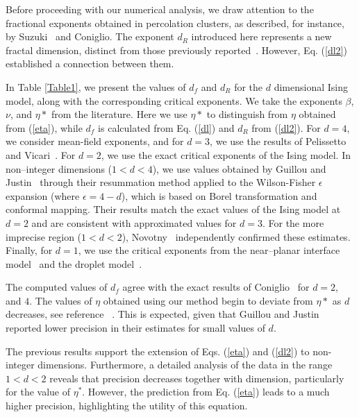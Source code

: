 \documentclass[pre,aps,twocolumn,showpacs,floatfix,nofootinbib,superscriptaddress,linenumbers]{revtex4-1}
\begin{document}

Before proceeding with our numerical analysis, we draw attention to the fractional exponents obtained in percolation clusters, as described, for instance, by Suzuki~\cite{Suzuki8} and Coniglio\cite{Coniglio89}. The exponent $d_R$ introduced here represents a new fractal dimension, distinct from those previously reported~\cite{Suzuki8,Coniglio89,Kroger00}.  However, Eq. (\ref{dl2}) established a connection between them.

In Table \ref{Table1}, we present the values of $d_f$ and $d_R$ for the $d$ dimensional Ising model, along with the corresponding critical exponents. We take the exponents $\beta $, $\nu$, and $\eta*$ from the literature. Here we use $\eta*$ to distinguish from $\eta$ obtained from (\ref{eta}), while $d_f$ is calculated from Eq. (\ref{dl}) and $d_R$  from (\ref{dl2}). For $d = 4$, we consider mean-field exponents, and for $d = 3$, we use the results of Pelissetto and Vicari~\cite{Pelissetto02}. For $d=2$, we use the exact critical exponents of the Ising model. In non--integer dimensions ($1<d<4$), we use  values obtained by Guillou and Justin~\cite{Guillou87} through their resummation method applied to the Wilson-Fisher $\epsilon$  expansion (where $\epsilon=4-d$), which is based on Borel transformation and conformal mapping. Their results  match the exact values of the Ising model at $d=2$ and are consistent with approximated values for $d=3$. For the more imprecise region ($1<d<2$), Novotny~\cite{Novotny92} independently confirmed these estimates. Finally, for $d=1$, we use the critical exponents from the near--planar interface model~\cite{Wallace79} and the droplet model~\cite{Bruce981,Bruce83}.

The computed values of $d_f$ agree with the exact results of Coniglio~\cite{Coniglio89} for $d=2$, and $4$. The values of $\eta$ obtained using our method begin to deviate from $\eta*$ as $d$ decreases, see reference ~\cite{Guillou87}. This is expected, given that Guillou and Justin~\cite{Guillou87} reported lower precision in their estimates for small values of $d$.

The previous results support the extension of Eqs. (\ref{eta}) and (\ref{dl2}) to non-integer dimensions. Furthermore, a detailed analysis of the data in the range $1<d<2$ reveals that precision decreases together with dimension, particularly for the value of $\eta^*$. However, the prediction from Eq. (\ref{eta}) leads to a much higher precision, highlighting the utility of this equation. 
\end{document}
